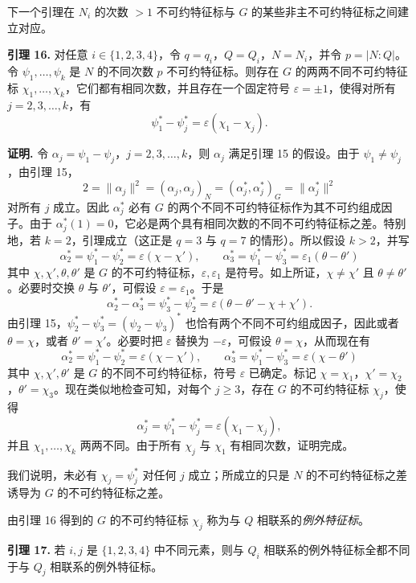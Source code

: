 下一个引理在 $N_i$ 的次数 $>1$ 不可约特征标与 $G$ 的某些非主不可约特征标之间建立对应。

\noindent\textbf{引理 16.} 对任意 $i\in\{1,2,3,4\}$，令 $q=q_i$，$Q=Q_i$，$N=N_i$，并令 $p=|N:Q|$。令 $\psi_1,\ldots,\psi_k$ 是 $N$ 的不同次数 $p$ 不可约特征标。则存在 $G$ 的两两不同不可约特征标 $\chi_1,\ldots,\chi_k$，它们都有相同次数，并且存在一个固定符号 $\varepsilon=\pm1$，使得对所有 $j=2,3,\ldots,k$，有
\[
  \psi_1^*-\psi_j^*=\varepsilon(\chi_1-\chi_j).
\]

\noindent\textbf{证明.} 令 $\alpha_j=\psi_1-\psi_j$，$j=2,3,\ldots,k$，则 $\alpha_j$ 满足引理 15 的假设。由于 $\psi_1\neq\psi_j$，由引理 15，
\[
  2=\|\alpha_j\|^2=(\alpha_j,\alpha_j)_N=(\alpha_j^*,\alpha_j^*)_G=\|\alpha_j^*\|^2
\]
对所有 $j$ 成立。因此 $\alpha_j^*$ 必有 $G$ 的两个不同不可约特征标作为其不可约组成因子。由于 $\alpha_j^*(1)=0$，它必是两个具有相同次数的不同不可约特征标之差。特别地，若 $k=2$，引理成立（这正是 $q=3$ 与 $q=7$ 的情形）。所以假设 $k>2$，并写
\[
  \alpha_2^*=\psi_1^*-\psi_2^*=\varepsilon(\chi-\chi'),
  \qquad
  \alpha_3^*=\psi_1^*-\psi_3^*=\varepsilon_1(\theta-\theta')
\]
其中 $\chi,\chi',\theta,\theta'$ 是 $G$ 的不可约特征标，$\varepsilon,\varepsilon_1$ 是符号。如上所证，$\chi\neq\chi'$ 且 $\theta\neq\theta'$。必要时交换 $\theta$ 与 $\theta'$，可假设 $\varepsilon=\varepsilon_1$。于是
\[
  \alpha_2^*-\alpha_3^*=\psi_3^*-\psi_2^*=\varepsilon(\theta-\theta'-\chi+\chi').
\]
由引理 15，$\psi_2^*-\psi_3^*=(\psi_2-\psi_3)^*$ 也恰有两个不同不可约组成因子，因此或者 $\theta=\chi$，或者 $\theta'=\chi'$。必要时把 $\varepsilon$ 替换为 $-\varepsilon$，可假设 $\theta=\chi$，从而现在有
\[
  \alpha_2^*=\psi_1^*-\psi_2^*=\varepsilon(\chi-\chi'),
  \qquad
  \alpha_3^*=\psi_1^*-\psi_3^*=\varepsilon(\chi-\theta')
\]
其中 $\chi,\chi',\theta'$ 是 $G$ 的不同不可约特征标，符号 $\varepsilon$ 已确定。标记 $\chi=\chi_1$，$\chi'=\chi_2$，$\theta'=\chi_3$。现在类似地检查可知，对每个 $j\geq3$，存在 $G$ 的不可约特征标 $\chi_j$，使得
\[
  \alpha_j^*=\psi_1^*-\psi_j^*=\varepsilon(\chi_1-\chi_j),
\]
并且 $\chi_1,
\ldots,\chi_k$ 两两不同。由于所有 $\chi_j$ 与 $\chi_1$ 有相同次数，证明完成。

我们说明，未必有 $\chi_j=\psi_j^*$ 对任何 $j$ 成立；所成立的只是 $N$ 的不可约特征标之差诱导为 $G$ 的不可约特征标之差。

由引理 16 得到的 $G$ 的不可约特征标 $\chi_j$ 称为与 $Q$ 相联系的\emph{例外特征标}。

\noindent\textbf{引理 17.} 若 $i,j$ 是 $\{1,2,3,4\}$ 中不同元素，则与 $Q_i$ 相联系的例外特征标全都不同于与 $Q_j$ 相联系的例外特征标。

